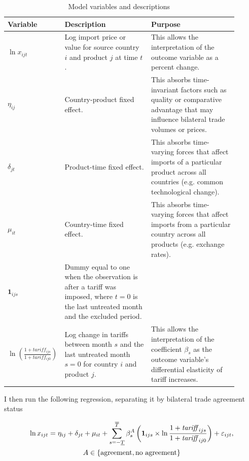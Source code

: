 \begin{table}[H]
    \centering
    \caption{Model variables and descriptions}\label{tab:model_variables}
    \begin{tabular}{p{0.14\linewidth} p{0.38\linewidth} p{0.38\linewidth}}
        \hline
        \textbf{Variable} & \textbf{Description} & \textbf{Purpose}\\
        \hline
        $\ln x_{ijt}$ & Log import price or value for source country $i$ and product $j$ at time $t$. & This allows the interpretation of the outcome variable as a percent change. \\[1ex]
        $\eta_{ij}$ & Country-product fixed effect. & This absorbs time-invariant factors such as quality or comparative advantage that may influence bilateral trade volumes or prices. \\[1ex]
        $\delta_{jt}$ & Product-time fixed effect. & This absorbs time-varying forces that affect imports of a particular product across all countries (e.g. common technological change). \\[1ex]
        $\mu_{it}$ & Country-time fixed effect. & This absorbs time-varying forces that affect imports from a particular country across all products (e.g. exchange rates). \\[1ex]
        $\mathbf{1}_{ijs}$ & Dummy equal to one when the observation is after a tariff was imposed, where $t=0$ is the last untreated month and the excluded period. & \\[1ex]
        $\ln \left( \frac{1 + tariff_{ijs}}{1 + tariff_{ij0}} \right)$ & Log change in tariffs between month $s$ and the last untreated month $s=0$ for country $i$ and product $j$. & This allows the interpretation of the coefficient $\beta_s$ as the outcome variable's differential elasticity of tariff increases. \\[1ex]
        \hline
    \end{tabular}
\end{table}

I then run the following regression, separating it by bilateral trade agreement status

    \begin{equation}
        \begin{gathered}
            \ln x_{ijt} = \eta_{ij} + \delta_{jt} + \mu_{it} + \sum_{s = -\underline{T}}^{\overline{T}} \beta_s^{A} \left( \mathbf{1}_{ijs} \times \ln \frac{1 + \mathit{tariff}_{ijs}}{1 + \mathit{tariff}_{ij0}} \right) + \varepsilon_{ijt}, \\
            A \in \{\textnormal{agreement}, \textnormal{no agreement}\}
        \end{gathered}
        \label{eq:agreement}
    \end{equation}

